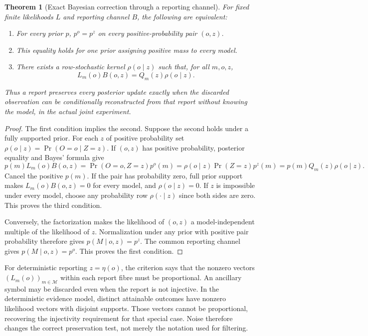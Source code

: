 \documentclass[11pt,letterpaper]{article}
\theoremstyle{plain}
\newtheorem{theorem}{Theorem}[section]
\theoremstyle{definition}
\newcommand{\M}{\mathcal M}\newcommand{\E}{\mathbb E}
\begin{document}
\begin{theorem}[Exact Bayesian correction through a reporting channel]\label{thm:bayes}
For fixed finite likelihoods $L$ and reporting channel $B$, the following are equivalent:
\begin{enumerate}[label=(\roman*)]
\item For every prior $p$, $p^o=p^z$ on every positive-probability pair $(o,z)$.
\item This equality holds for one prior assigning positive mass to every model.
\item There exists a row-stochastic kernel $\rho(o\mid z)$ such that, for all $m,o,z$,
\begin{equation}\label{eq:bayes-factorization}
L_m(o)B(o,z)=Q_m(z)\rho(o\mid z).
\end{equation}
\end{enumerate}
Thus a report preserves every posterior update exactly when the discarded observation can be conditionally reconstructed from that report without knowing the model, in the actual joint experiment.
\end{theorem}
\begin{proof}
The first condition implies the second. Suppose the second holds under a fully supported prior. For each $z$ of positive probability set $\rho(o\mid z)=\Pr(O=o\mid Z=z)$. If $(o,z)$ has positive probability, posterior equality and Bayes' formula give
\[
p(m)L_m(o)B(o,z)
=\Pr(O=o,Z=z)p^o(m)
=\rho(o\mid z)\Pr(Z=z)p^z(m)
=p(m)Q_m(z)\rho(o\mid z).
\]
Cancel the positive $p(m)$. If the pair has probability zero, full prior support makes $L_m(o)B(o,z)=0$ for every model, and $\rho(o\mid z)=0$. If $z$ is impossible under every model, choose any probability row $\rho(\cdot\mid z)$ since both sides are zero. This proves the third condition.

Conversely, the factorization makes the likelihood of $(o,z)$ a model-independent multiple of the likelihood of $z$. Normalization under any prior with positive pair probability therefore gives $p(M\mid o,z)=p^z$. The common reporting channel gives $p(M\mid o,z)=p^o$. This proves the first condition.
\end{proof}

For deterministic reporting $z=\eta(o)$, the criterion says that the nonzero vectors $(L_m(o))_{m\in\M}$ within each report fibre must be proportional. An ancillary symbol may be discarded even when the report is not injective. In the deterministic evidence model, distinct attainable outcomes have nonzero likelihood vectors with disjoint supports. Those vectors cannot be proportional, recovering the injectivity requirement for that special case. Noise therefore changes the correct preservation test, not merely the notation used for filtering.
\end{document}
